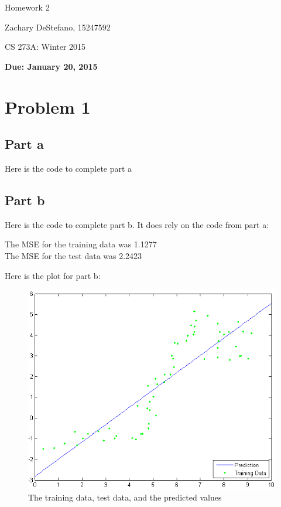 \documentclass[twoside,11pt]{article}
\theoremstyle{definition}
\begin{document}
\centerline{\Large Homework 2}
\centerline{Zachary DeStefano, 15247592}
\centerline{CS 273A: Winter 2015}
\centerline{\bf Due: January 20, 2015}

\section*{Problem 1}

\subsection*{Part a}

Here is the code to complete part a


\subsection*{Part b}

Here is the code to complete part b. It does rely on the code from part a:

The MSE for the training data was 1.1277\\
The MSE for the test data was 2.2423\\

\newpage

Here is the plot for part b:
\begin{figure}[h]
\centering
\includegraphics[width=5 in]{prob1bPlot.png}
\caption{The training data, test data, and the predicted values}
\end{figure}
\end{document}
